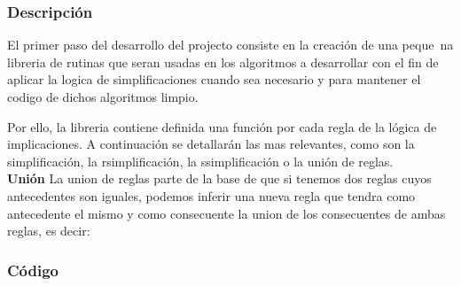 \subsubsection{Descripci\'on} 
El primer paso del desarrollo del projecto consiste en la creaci\'on de una peque\!~na libreria de rutinas que seran usadas en los algoritmos a desarrollar con el fin de aplicar la logica de simplificaciones cuando sea necesario y para mantener el codigo de dichos algoritmos limpio.

Por ello, la libreria contiene definida una funci\'on por cada regla de la l\'ogica de implicaciones. A continuaci\'on se detallar\'an las mas relevantes, como son la simplificaci\'on, la rsimplificaci\'on, la ssimplificaci\'on o la uni\'on de reglas.\\
\textbf{Uni\'on}
La union de reglas parte de la base de que si tenemos dos reglas cuyos antecedentes son iguales, podemos inferir una nueva regla que tendra como antecedente el mismo y como consecuente la union de los consecuentes de ambas reglas, es decir:


\subsubsection{C\'odigo} 

